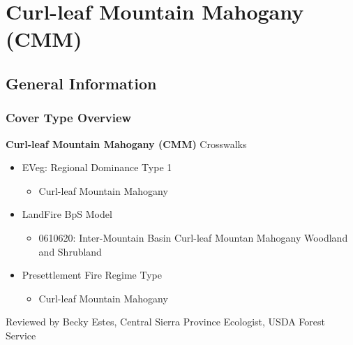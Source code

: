 \newpage
\section{Curl-leaf Mountain Mahogany (CMM)}
\label{cmm-description}

\subsection*{General Information}

\subsubsection{Cover Type Overview}

\textbf{Curl-leaf Mountain Mahogany (CMM)}
\newline
Crosswalks
\begin{itemize}
	\item EVeg: Regional Dominance Type 1
	\begin{itemize}
		\item Curl-leaf Mountain Mahogany
	\end{itemize}

	\item LandFire BpS Model
	\begin{itemize}
		\item 0610620: Inter-Mountain Basin Curl-leaf Mountan Mahogany Woodland and Shrubland
	\end{itemize}

	\item Presettlement Fire Regime Type
	\begin{itemize}
		\item Curl-leaf Mountain Mahogany
	\end{itemize}
\end{itemize}

\noindent Reviewed by Becky Estes, Central Sierra Province Ecologist, USDA Forest Service

